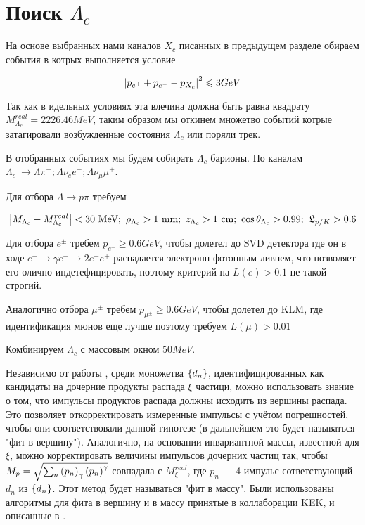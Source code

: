 \section{Поиск $\Lambda_c$}

На основе выбранных нами каналов $X_c$ писанных в предыдущем разделе 
обираем события в котрых выполняется условие 

\begin{equation}
    \abs{p_{e^+} + p_{e^-} - p_{X_c}}^2 \leqslant 3 GeV
\end{equation}

Так как в идельных условиях эта влечина должна быть равна квадрату $M^{real}_{\Lambda_c} = 2226.46 MeV$, 
таким образом мы откинем множетво событий котрые затагировали 
возбужденные состояния $\Lambda_c$ или поряли трек.

В отобранных событиях мы будем собирать $\Lambda_c$ барионы. 
По каналам $\Lambda_c^+ \to \Lambda \pi^+; \Lambda \nu_e e^+; \Lambda \nu_\mu \mu^+$.



\newdot Для отбора $\Lambda \to p \pi$ требуем 

$$
\abs{ M_{\Lambda_c} - M^{real}_{\Lambda_c} } < 30 \text{ MeV}; 
\ \rho_{\Lambda_c} > 1 \text{ mm}; \ z_{\Lambda_c} > 1 \text{ cm}; 
\ \cos \theta_{\Lambda_c} > 0.99;
\ \mathfrak{L}_{p/K } > 0.6 
$$

\newdot Для отбора $e^\pm$ требем $p_{e^\pm} \geq 0.6 GeV$, чтобы долетел до SVD 
детектора где он в ходе $e^- \to \gamma e^- \to 2e^- e^+$ распадается электронн-фотонным ливнем, 
что позволяет его олично индетефицировать, поэтому критерий на $L(e) > 0.1$ не такой строгий.

\newdot Аналогично отбора $\mu^\pm$ требем $p_{\mu^\pm} \geq 0.6 GeV$, чтобы долетел до KLM, 
где идентификация мюнов еще лучше поэтому требуем $L(\mu) > 0.01$ 


\newdot Комбинируем $\Lambda_c$ с массовым окном $50 MeV$.

\newdot Независимо от работы \cite{BelleDetector2002}, среди моножетва $\left\{ d_n \right\}$, 
идентифицированных как кандидаты на дочерние продукты распада $\xi$ частици, 
можно использовать знание о том, что импульсы продуктов распада должны исходить 
из вершины распада. Это позволяет откорректировать измеренные импульсы с учётом 
погрешностей, чтобы они соответствовали данной гипотезе (в дальнейшем это будет 
называться "фит в вершину"). Аналогично, на основании инвариантной массы, 
известной для $\xi$, можно корректировать величины импульсов дочерних частиц 
так, чтобы $M_{p} = \sqrt{\sum_n \left( p_n \right)_\gamma \left( p_n \right)^\gamma}$ 
совпадала с $M^{real}_{\xi}$, где $p_n$ --- 4-импульс сответствующий $d_n$ 
из $\left\{ d_n \right\}$. Этот метод будет называться "фит в массу". Были использованы 
алгоритмы для фита в вершину и в массу принятые в коллаборации KEK, и описанные 
в \cite{Krohn2021}.


